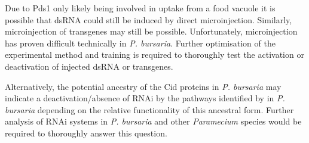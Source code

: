 Due to Pds1 only likely being involved in uptake from a food vacuole it is possible
that dsRNA could still be induced by direct microinjection.  Similarly, 
microinjection of transgenes may still be possible.  Unfortunately, microinjection
has proven difficult technically in \textit{P. bursaria}.  Further optimisation
of the experimental method and training is required to thoroughly test
the activation or deactivation of injected dsRNA or transgenes.

Alternatively, the potential ancestry of the Cid proteins in \textit{P. bursaria}
may indicate a deactivation/absence
of RNAi by the pathways identified by \citep{Marker2014} in \textit{P. bursaria}
depending on the relative functionality of this ancestral form.
Further analysis of RNAi systems in \textit{P. bursaria} and other \textit{Paramecium}
species would be required to thoroughly answer this question.

